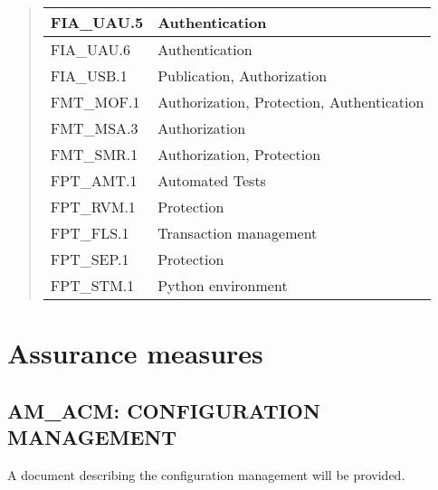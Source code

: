 \documentclass[10pt,a4paper,english]{scrbook}
\begin{document}
\begin{quote}
\begin{longtable}[c]{|l|l|}
FIA{\_}UAU.5
 & 
Authentication
 \\
\hline

FIA{\_}UAU.6
 & 
Authentication
 \\
\hline

FIA{\_}USB.1
 & 
Publication, Authorization
 \\
\hline

FMT{\_}MOF.1
 & 
Authorization, Protection, Authentication
 \\
\hline

FMT{\_}MSA.3
 & 
Authorization
 \\
\hline

FMT{\_}SMR.1
 & 
Authorization, Protection
 \\
\hline

FPT{\_}AMT.1
 & 
Automated Tests
 \\
\hline

FPT{\_}RVM.1
 & 
Protection
 \\
\hline

FPT{\_}FLS.1
 & 
Transaction management
 \\
\hline

FPT{\_}SEP.1
 & 
Protection
 \\
\hline

FPT{\_}STM.1
 & 
Python environment
 \\
\hline
\end{longtable}
\end{quote}



\hypertarget{assurance-measures}{}
\section{Assurance measures}



\hypertarget{am-acm-configuration-management}{}
\subsection{AM{\_}ACM: CONFIGURATION MANAGEMENT}

A document describing the configuration management will be provided.


\end{document}
